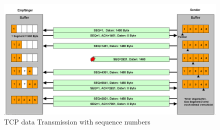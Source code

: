 \begin{figure}
      \centering
      \includegraphics[width=\textwidth]{gfx/Tcp_transfer.png}
      \caption{TCP data Transmission with sequence numbers}
      \label{fig:tcp_data_transmission}
\end{figure}